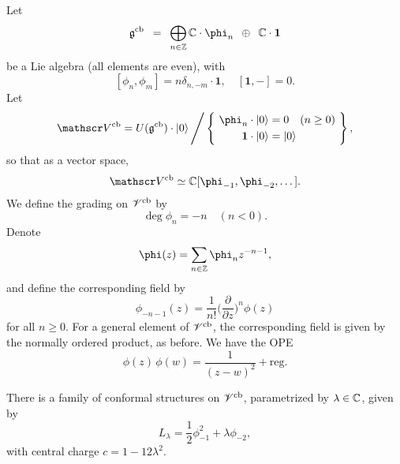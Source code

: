 \begin{example} 
    Let
    \[
        \frg^\cb \enspace = \enspace 
        \bigoplus_{n \in \bbZ} \bbC \cdot \phi_n
        \enspace \oplus \enspace \bbC \cdot \mathbf{1}
    \]
    be a Lie algebra (all elements are even), with
    \[
        [\phi_n, \phi_m] = n \delta_{n, -m} \cdot \mathbf{1}, \quad
        [\mathbf{1}, -] = 0.
    \]
    Let
    \[
        \scrV^\cb = 
        U (\frg^\cb) \cdot \ket{0} \Bigg/
        \left\{ \ 
            \begin{aligned}
                \phi_n \cdot \ket{0} &= 0 \quad (n \geq 0) \\
                \mathbf{1} \cdot \ket{0} &= \ket{0}
            \end{aligned}
        \ \right\},
    \]
    so that as a vector space,
    \[
        \scrV^\cb \simeq \bbC[\phi_{-1}, \phi_{-2}, \dotsc].
    \]
    We define the grading on $\mathscr{V}^{\mathrm{cb}}$ by
    \[
        \deg \phi_n = -n \quad (n < 0).
    \]
    Denote
    \[
        \phi (z) = \sum_{n \in \bbZ} \phi_n z^{-n-1},
    \]
    and define the corresponding field by
    \[
        \phi_{-n - 1} (z) =
        \frac{1}{n!}
        \biggl( \frac {\partial} {\partial z} \biggr)^n \phi (z)
    \]
    for all $n \geq 0$.
    For a general element of $\mathscr{V}^{\mathrm{cb}}$,
    the corresponding field is given by the normally ordered product, as before.
    We have the OPE
    \[
        \phi (z) \, \phi (w) = \frac {1} {(z - w)^2} + \text{reg.}
    \]
    
    There is a family of conformal structures on $\mathscr{V}^{\mathrm{cb}}$,
    parametrized by $\lambda \in \mathbb{C}$,
    given by
    \[
        L_\lambda = \frac{1}{2} \phi_{-1}^2 + \lambda \phi_{-2},
    \]
    with central charge $c = 1 - 12 \lambda^2$. \varqed
\end{example}


